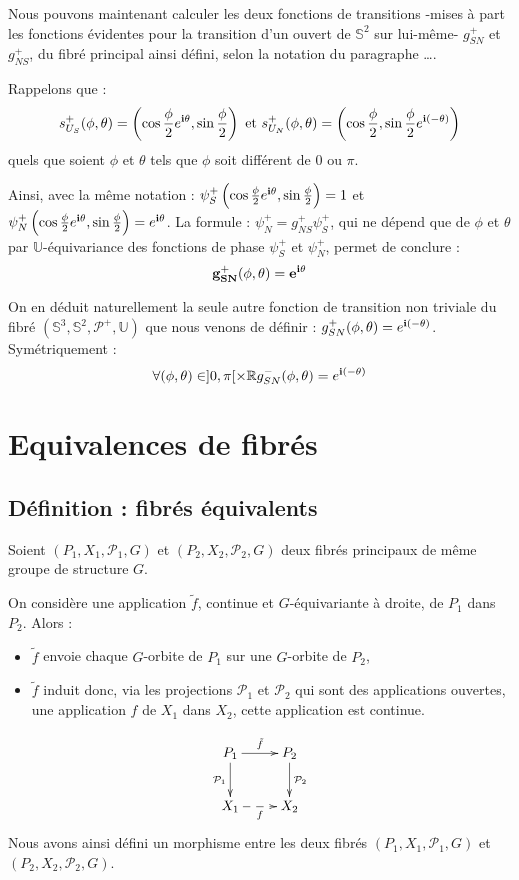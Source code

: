 \begin{exem}
Nous pouvons maintenant calculer les deux fonctions de transitions -mises \`a part les fonctions \'evidentes pour la transition d'un ouvert de $\mathbb{S}^2$ sur lui-m\^eme- %
$g_{SN}^+$ et $g_{NS}^+$, du fibr\'e principal ainsi d\'efini, selon la notation du paragraphe \dots .
\par
Rappelons que : \[\se{S}{+}(\phi ,\theta )=\left(\cos\frac{\phi}{2}\ec{\theta},\sin\frac{\phi}{2}\right)\text{ et }%
\se{N}{+}(\phi ,\theta )=\left(\cos\frac{\phi}{2},\sin\frac{\phi}{2}\ec{(-\theta)}\right)\]
quels que soient $\phi$ et $\theta$ tels que $\phi$ soit diff\'erent de $0$ ou $\pi$.
\par
Ainsi, avec la m\^eme notation : $\psi_S^+\left(\cos\frac{\phi}{2}e^{\mathbf{i}\theta},\sin\frac{\phi}{2}\right)=1$ et $\psi_N^+\left(\cos\frac{\phi}{2}e^{\mathbf{i}\theta},\sin\frac{\phi}{2}\right)=e^{\mathbf{i}\theta}$. %
La formule : $\psi_N^+=g_{NS}^+\psi_S^+$, qui ne d\'epend que de $\phi$ et $\theta$ par $\mathbb{U}$-\'equivariance des fonctions de phase $\psi_S^+$ et $\psi_N^+$, %
permet de conclure :\[\mathbf{g_{SN}^+(\phi ,\theta )=e^{\mathbf{i}\theta}}\]
\par
On en d\'eduit naturellement la seule autre fonction de transition non triviale du fibr\'e $(\mathbb{S}^3,\mathbb{S}^2,\mathcal{P}^+,\mathbb{U})$ que nous venons de d\'efinir : %
$g_{SN}^+(\phi ,\theta )=e^{\mathbf{i}(-\theta )}$.
\etoile
Sym\'etriquement :
\[\forall (\phi,\theta)\in ]0,\pi [\times\mathbb{R}g_{SN}^-(\phi,\theta)=e^{\mathbf{i}(-\theta)}\]
\end{exem}


\section{Equivalences de fibr\'es}

\subsection{D\'efinition : fibr\'es \'equivalents}

\begin{prefi}
Soient $(P_1,X_1,\mathcal{P}_1,G)$ et $(P_2,X_2,\mathcal{P}_2,G)$ deux fibrés principaux de même groupe de structure $G$.
\par
On considère une application $\tilde{f}$, continue et $G$-équivariante à droite, de $P_1$ dans $P_2$. Alors :
\begin{itemize}
\item $\tilde{f}$ envoie chaque $G$-orbite de $P_1$ sur une $G$-orbite de $P_2$,
\item $\tilde{f}$ induit donc, via les projections $\mathcal{P}_1$ et $\mathcal{P}_2$ qui sont des applications ouvertes, %
une application $f$ de $X_1$ dans $X_2$, cette application est continue.
\end{itemize}
\[\xymatrix{%
P_1\ar[d]_{\mathcal{P}_1}\ar[r]^{\tilde{f}}&P_2\ar[d]^{\mathcal{P}_2}\\%
X_1\ar@{-->}[r]_{f}&X_2%
}\]
Nous avons ainsi d\'efini un morphisme entre les deux fibr\'es $(P_1,X_1,\mathcal{P}_1,G)$ et $(P_2,X_2,\mathcal{P}_2,G)$.
\end{prefi}

